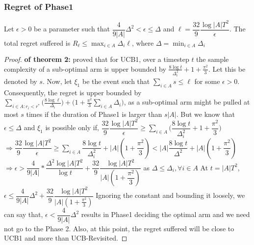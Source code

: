 \subsubsection{Regret of Phase1}
\begin{theorem}
Let $\epsilon>0$ be a parameter such that $\dfrac{4}{9|A|}\Delta^{2}<\epsilon\leq \Delta$ and $\ell=\dfrac{32}{9}\dfrac{ \log |A|T^{2}}{\epsilon}$. The total regret suffered is $R_{\ell}\leq \max_{i\in A}{\Delta}_{i}\ell$, where $\Delta=\min_{i\in A}{\Delta_{i}}$
\end{theorem}
\begin{proof}\textbf{ of theorem 2:}
\cite{auer2002finite} proved that for UCB1, over a timestep $t$ the sample complexity of a sub-optimal arm is upper bounded by 
$\frac{8\log t}{\Delta_{i}^{2}} + 1 + \frac{\pi^{2}}{3}$. Let this be denoted by $s$. Now, let $\xi_{1}$ be the event such that $\sum_{i\in A} s\leq \ell$ for some $\epsilon>0$. Consequently, the regret is upper bounded by $\sum_{i \in A:r_{i}<r^{*}}\bigg(\frac{8\log \ell}{\Delta_{i}}\bigg) + \bigg(1 + \frac{\pi^{2}}{3}\sum_{i \in A}\Delta_{i}\bigg)$, as a sub-optimal arm might be pulled at most $s$ times if the duration of Phase1 is larger than $s|A|$. But we know that $\epsilon\leq\Delta$ and %
$\xi_{1}$ is possible only if,
\newline
\newline
\hspace*{8em}$\dfrac{32}{9}\dfrac{\log|A|T^{2}}{\epsilon}\geq \sum_{i\in A}\bigg(\dfrac{8\log t}{\Delta_{i}^{2}} + 1 + \dfrac{\pi^{2}}{3}\bigg)$
\newline
\newline
\hspace*{8em}$\Rightarrow \dfrac{32}{9}\dfrac{\log|A|T^{2}}{\epsilon}\geq \sum_{i\in A}\dfrac{8\log t}{\Delta_{i}^{2}} + |A|(1 + \dfrac{\pi^{2}}{3}) < |A|\dfrac{8\log t}{\Delta^{2}} + |A|(1 + \dfrac{\pi^{2}}{3})$
\newline
\newline
\hspace*{8em}$\Rightarrow \epsilon >  \dfrac{4}{9|A|}*\dfrac{\Delta^{2}\log|A|T^{2}}{\log t} + \dfrac{32}{9}\dfrac{\log|A|T^{2}}{|A|(1 + \dfrac{\pi^{2}}{3})}$ as $\Delta \leq \Delta_{i}, \forall i\in A$
\newline
At $t=|A|T^{2}$, $ \epsilon \leq \dfrac{4}{9|A|}\Delta^{2} + \dfrac{32}{9}\dfrac{\log|A|T^{2}}{|A|(1 + \frac{\pi^{2}}{3})}$
\newline
Ignoring the constant and bounding it loosely, we can say that, 
$\epsilon < \dfrac{4}{9|A|}\Delta^{2}$ results in Phase1 deciding the optimal arm and we need not go to the Phase 2. Also, at this point, the regret suffered will be close to UCB1 and more than UCB-Revisited.
\newline

\end{proof}
